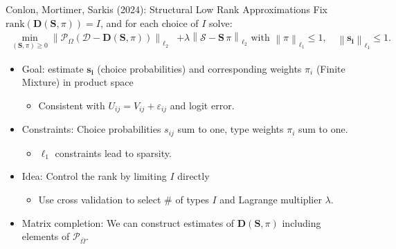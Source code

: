 \begin{frame}{Conlon, Mortimer, Sarkis (2024): Structural Low Rank Approximations}
\small
Fix $\textrm{rank}(\mathbf{D}(\mathbf{S},\pi))=I$, and for each choice of $I$ solve:
\begin{align*}
\min _{(\mathbf{S}, \pi) \geq 0} \left\|\mathcal{P}_{\Omega}(\mathcal{D}-\mathbf{D}(\mathbf{S},\pi))\right\|_{\ell_2}  &+ \lambda \left\|\mathcal{S}- \mathbf{S}\,\pi \right\|_{\ell_2} \text { with } \left\|\pi  \right\|_{\ell_1} \leq 1, \quad   \left\|\mathbf{s_i}  \right\|_{\ell_1} \leq 1.
\end{align*}
\vspace{-.25cm}
\begin{itemize}
\item Goal: estimate $\mathbf{s_i}$ (choice probabilities) and corresponding weights $\pi_i$ (Finite Mixture) in \alert{product space}
\begin{itemize}
\item Consistent with $U_{ij} = V_{ij} + \varepsilon_{ij}$ and logit error.
\end{itemize}
\item Constraints: Choice probabilities $s_{ij}$ sum to one, type weights $\pi_i$ sum to one.
\begin{itemize}
\item $\ell_1$ constraints lead to \alert{sparsity}.
\end{itemize}
\item Idea: \alert{Control the rank by limiting $I$ directly}
\begin{itemize}
\item Use cross validation to select \# of types $I$ and Lagrange multiplier $\lambda$.
\end{itemize}
\item Matrix completion: We can construct estimates of $\mathbf{D}(\mathbf{S},\pi)$ including elements of $\mathcal{P}_{\overline{\Omega}}$.
\end{itemize}
\end{frame}

